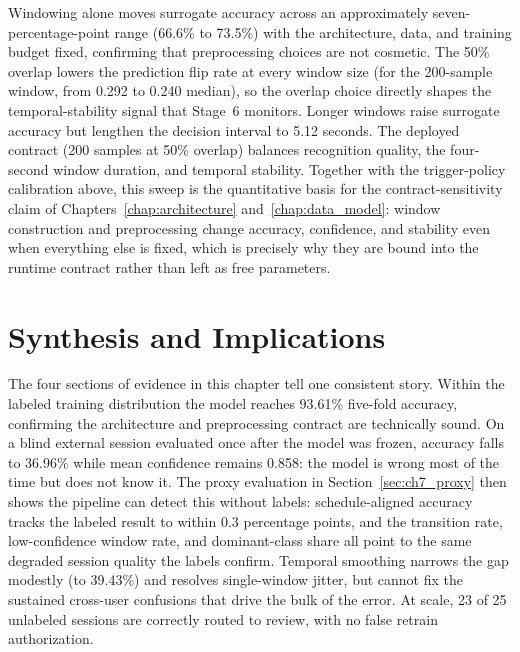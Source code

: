 Windowing alone moves surrogate accuracy across an approximately seven-percentage-point range (66.6\% to 73.5\%) with the architecture, data, and training budget fixed, confirming that preprocessing choices are not cosmetic. The 50\% overlap lowers the prediction flip rate at every window size (for the 200-sample window, from 0.292 to 0.240 median), so the overlap choice directly shapes the temporal-stability signal that Stage~6 monitors. Longer windows raise surrogate accuracy but lengthen the decision interval to 5.12 seconds. The deployed contract (200 samples at 50\% overlap) balances recognition quality, the four-second window duration, and temporal stability. Together with the trigger-policy calibration above, this sweep is the quantitative basis for the contract-sensitivity claim of Chapters~\ref{chap:architecture} and~\ref{chap:data_model}: window construction and preprocessing change accuracy, confidence, and stability even when everything else is fixed, which is precisely why they are bound into the runtime contract rather than left as free parameters.

\section{Synthesis and Implications}
\label{sec:ch7_synthesis}

The four sections of evidence in this chapter tell one consistent story. Within the labeled training distribution the model reaches 93.61\% five-fold accuracy, confirming the architecture and preprocessing contract are technically sound. On a blind external session evaluated once after the model was frozen, accuracy falls to 36.96\% while mean confidence remains 0.858: the model is wrong most of the time but does not know it. The proxy evaluation in Section~\ref{sec:ch7_proxy} then shows the pipeline can detect this without labels: schedule-aligned accuracy tracks the labeled result to within 0.3 percentage points, and the transition rate, low-confidence window rate, and dominant-class share all point to the same degraded session quality the labels confirm. Temporal smoothing narrows the gap modestly (to 39.43\%) and resolves single-window jitter, but cannot fix the sustained cross-user confusions that drive the bulk of the error. At scale, 23 of 25 unlabeled sessions are correctly routed to review, with no false retrain authorization.

